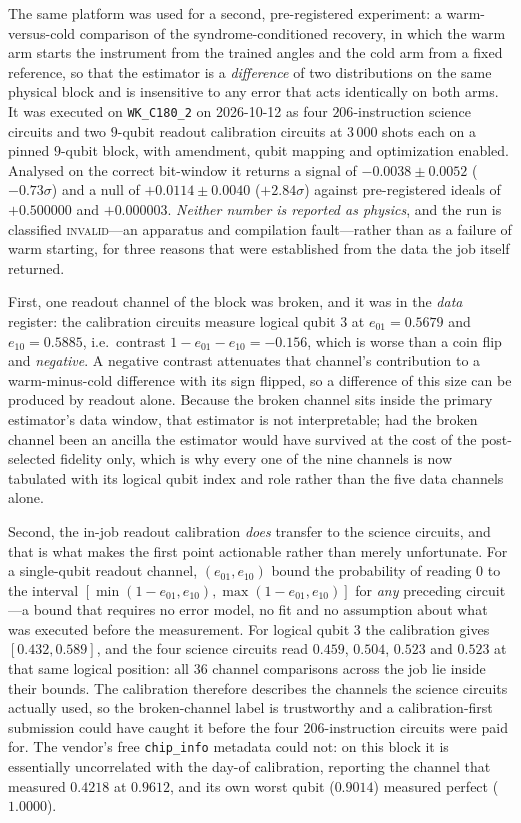 \documentclass[aps,prxquantum,reprint,superscriptaddress]{revtex4-2}
\begin{document}
The same platform was used for a second, pre-registered experiment: a
warm-versus-cold comparison of the syndrome-conditioned recovery, in which the
warm arm starts the instrument from the trained angles and the cold arm from a
fixed reference, so that the estimator is a \emph{difference} of two
distributions on the same physical block and is insensitive to any error that
acts identically on both arms. It was executed on \texttt{WK\_C180\_2} on
2026-10-12 as four $206$-instruction science circuits and two $9$-qubit readout
calibration circuits at $3\,000$ shots each on a pinned $9$-qubit block, with
amendment, qubit mapping and optimization enabled. Analysed on the correct
bit-window it returns a signal of $-0.0038\pm0.0052$ ($-0.73\sigma$) and a null
of $+0.0114\pm0.0040$ ($+2.84\sigma$) against pre-registered ideals of
$+0.500000$ and $+0.000003$. \emph{Neither number is reported as physics}, and
the run is classified \textsc{invalid}---an apparatus and compilation
fault---rather than as a failure of warm starting, for three reasons that were
established from the data the job itself returned.

First, one readout channel of the block was broken, and it was in the
\emph{data} register: the calibration circuits measure logical qubit $3$ at
$e_{01}=0.5679$ and $e_{10}=0.5885$, i.e.\ contrast $1-e_{01}-e_{10}=-0.156$,
which is worse than a coin flip and \emph{negative}. A negative contrast
attenuates that channel's contribution to a warm-minus-cold difference with its
sign flipped, so a difference of this size can be produced by readout alone.
Because the broken channel sits inside the primary estimator's data window, that
estimator is not interpretable; had the broken channel been an ancilla the
estimator would have survived at the cost of the post-selected fidelity only,
which is why every one of the nine channels is now tabulated with its logical
qubit index and role rather than the five data channels alone.

Second, the in-job readout calibration \emph{does} transfer to the science
circuits, and that is what makes the first point actionable rather than merely
unfortunate. For a single-qubit readout channel, $(e_{01},e_{10})$ bound the
probability of reading $0$ to the interval
$[\min(1-e_{01},e_{10}),\max(1-e_{01},e_{10})]$ for \emph{any} preceding
circuit---a bound that requires no error model, no fit and no assumption about
what was executed before the measurement. For logical qubit $3$ the calibration
gives $[0.432,0.589]$, and the four science circuits read $0.459$, $0.504$,
$0.523$ and $0.523$ at that same logical position: all $36$ channel comparisons
across the job lie inside their bounds. The calibration therefore describes the
channels the science circuits actually used, so the broken-channel label is
trustworthy and a calibration-first submission could have caught it before the
four $206$-instruction circuits were paid for. The vendor's free
\texttt{chip\_info} metadata could not: on this block it is essentially
uncorrelated with the day-of calibration, reporting the channel that measured
$0.4218$ at $0.9612$, and its own worst qubit ($0.9014$) measured perfect
($1.0000$).
\end{document}
